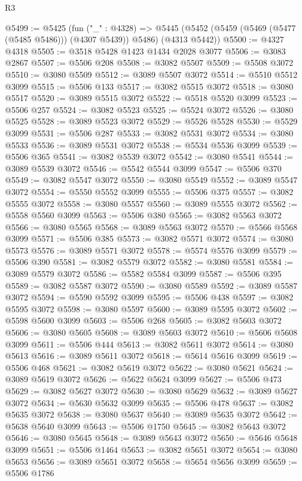 \begin{lexlean}{R3}
\begin{coremodule}
@5499 := @5425
    (fun ("_" : @4328) =>
    @5445 (@5452 (@5459 (@5469 (@5477 (@5485 @5486))) (@4307 @5439)) @5486) (@4313 @5442))
@5500 := @4327 @4318
@5505 := @3518 @5428 @1423 @1434 @2028 @3077
@5506 := @3083 @2867
@5507 := @5506 @208
@5508 := @3082 @5507
@5509 := @5508 @3072
@5510 := @3080 @5509
@5512 := @3089 @5507 @3072
@5514 := @5510 @5512 @3099
@5515 := @5506 @133
@5517 := @3082 @5515 @3072
@5518 := @3080 @5517
@5520 := @3089 @5515 @3072
@5522 := @5518 @5520 @3099
@5523 := @5506 @257
@5524 := @3082 @5523
@5525 := @5524 @3072
@5526 := @3080 @5525
@5528 := @3089 @5523 @3072
@5529 := @5526 @5528
@5530 := @5529 @3099
@5531 := @5506 @287
@5533 := @3082 @5531 @3072
@5534 := @3080 @5533
@5536 := @3089 @5531 @3072
@5538 := @5534 @5536 @3099
@5539 := @5506 @365
@5541 := @3082 @5539 @3072
@5542 := @3080 @5541
@5544 := @3089 @5539 @3072
@5546 := @5542 @5544 @3099
@5547 := @5506 @370
@5549 := @3082 @5547 @3072
@5550 := @3080 @5549
@5552 := @3089 @5547 @3072
@5554 := @5550 @5552 @3099
@5555 := @5506 @375
@5557 := @3082 @5555 @3072
@5558 := @3080 @5557
@5560 := @3089 @5555 @3072
@5562 := @5558 @5560 @3099
@5563 := @5506 @380
@5565 := @3082 @5563 @3072
@5566 := @3080 @5565
@5568 := @3089 @5563 @3072
@5570 := @5566 @5568 @3099
@5571 := @5506 @385
@5573 := @3082 @5571 @3072
@5574 := @3080 @5573
@5576 := @3089 @5571 @3072
@5578 := @5574 @5576 @3099
@5579 := @5506 @390
@5581 := @3082 @5579 @3072
@5582 := @3080 @5581
@5584 := @3089 @5579 @3072
@5586 := @5582 @5584 @3099
@5587 := @5506 @395
@5589 := @3082 @5587 @3072
@5590 := @3080 @5589
@5592 := @3089 @5587 @3072
@5594 := @5590 @5592 @3099
@5595 := @5506 @438
@5597 := @3082 @5595 @3072
@5598 := @3080 @5597
@5600 := @3089 @5595 @3072
@5602 := @5598 @5600 @3099
@5603 := @5506 @268
@5605 := @3082 @5603 @3072
@5606 := @3080 @5605
@5608 := @3089 @5603 @3072
@5610 := @5606 @5608 @3099
@5611 := @5506 @444
@5613 := @3082 @5611 @3072
@5614 := @3080 @5613
@5616 := @3089 @5611 @3072
@5618 := @5614 @5616 @3099
@5619 := @5506 @468
@5621 := @3082 @5619 @3072
@5622 := @3080 @5621
@5624 := @3089 @5619 @3072
@5626 := @5622 @5624 @3099
@5627 := @5506 @473
@5629 := @3082 @5627 @3072
@5630 := @3080 @5629
@5632 := @3089 @5627 @3072
@5634 := @5630 @5632 @3099
@5635 := @5506 @478
@5637 := @3082 @5635 @3072
@5638 := @3080 @5637
@5640 := @3089 @5635 @3072
@5642 := @5638 @5640 @3099
@5643 := @5506 @1750
@5645 := @3082 @5643 @3072
@5646 := @3080 @5645
@5648 := @3089 @5643 @3072
@5650 := @5646 @5648 @3099
@5651 := @5506 @1464
@5653 := @3082 @5651 @3072
@5654 := @3080 @5653
@5656 := @3089 @5651 @3072
@5658 := @5654 @5656 @3099
@5659 := @5506 @1786

\end{coremodule}
\end{lexlean}
